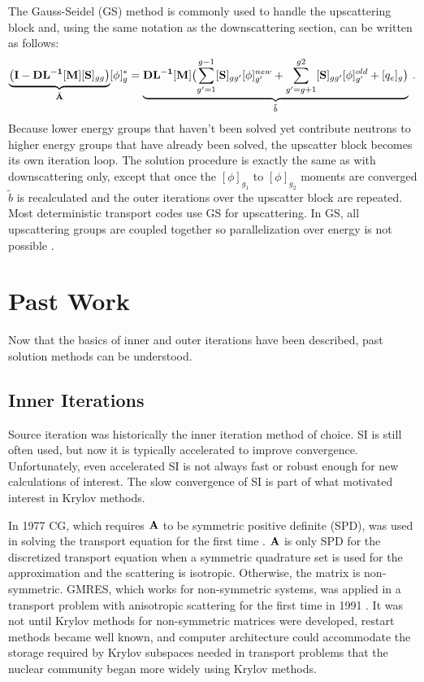 The Gauss-Seidel (GS) method is commonly used to handle the upscattering block and, using the same notation as the downscattering section, can be written as follows:
%
\begin{equation}
\underbrace{\bigl( \mathbf{I} - \mathbf{DL^{-1}}[\mathbf{M}][\mathbf{S}]_{gg} \bigr)}_{\tilde{\mathbf{A}}} [\phi]^{*}_{g} = \underbrace{\mathbf{DL^{-1}}[\mathbf{M}] \bigl( \sum_{g'=1}^{g-1}[\mathbf{S}]_{gg'}[\phi]^{new}_{g'} + \sum_{g'=g+1}^{g2} [\mathbf{S}]_{gg'}[\phi]^{old}_{g'}  + [q_{e}]_{g} \bigr)}_{\tilde{b}}  \:.
 \label{eq:up-GS}
\end{equation}
%
Because lower energy groups that haven't been solved yet contribute neutrons to higher energy groups that have already been solved, the upscatter block becomes its own iteration loop. The solution procedure is exactly the same as with downscattering only, except that once the $[\phi]_{g_{1}}$ to $[\phi]_{g_{2}}$ moments are converged $\tilde{b}$ is recalculated and the outer iterations over the upscatter block are repeated. Most deterministic transport codes use GS for upscattering. In GS, all upscattering groups are coupled together so parallelization over energy is not possible \cite{Evans2009d}. 

\section{Past Work}
Now that the basics of inner and outer iterations have been described, past solution methods can be understood. 

\subsection{Inner Iterations}
Source iteration was historically the inner iteration method of choice. SI is still often used, but now it is typically accelerated to improve convergence. Unfortunately, even accelerated SI is not always fast or robust enough for new calculations of interest. The slow convergence of SI is part of what motivated interest in Krylov methods. 

In 1977 CG, which requires $\mathbf{A}$ to be symmetric positive definite (SPD), was used in solving the transport equation for the first time \cite{Lewis1977}. $\mathbf{A}$ is only SPD for the discretized transport equation when a symmetric quadrature set is used for the \Sn approximation and the scattering is isotropic. Otherwise, the matrix is non-symmetric. GMRES, which works for non-symmetric systems, was applied in a transport problem with anisotropic scattering for the first time in 1991 \cite{Adams2002}. It was not until Krylov methods for non-symmetric matrices were developed, restart methods became well known, and computer architecture could accommodate the storage required by Krylov subspaces needed in transport problems that the nuclear community began more widely using Krylov methods. 

